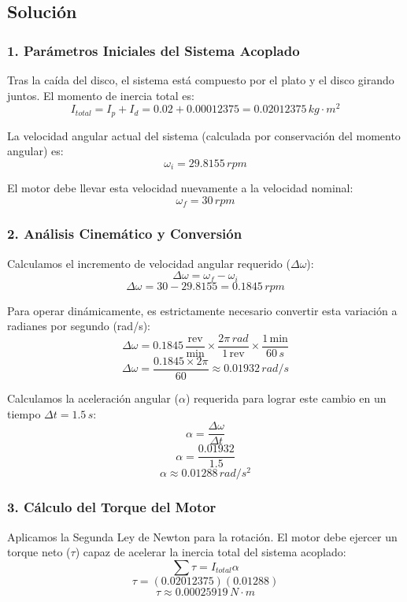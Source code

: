 \documentclass[12pt, a4paper]{article}
\begin{document}
\subsection*{Solución}

\subsubsection*{1. Parámetros Iniciales del Sistema Acoplado}
Tras la caída del disco, el sistema está compuesto por el plato y el disco girando juntos.
El momento de inercia total es:
$$I_{total} = I_p + I_d = 0.02 + 0.00012375 = 0.02012375 \, \si{kg\cdot m^2}$$

La velocidad angular actual del sistema (calculada por conservación del momento angular) es:
$$\omega_i = 29.8155 \, \si{rpm}$$

El motor debe llevar esta velocidad nuevamente a la velocidad nominal:
$$\omega_f = 30 \, \si{rpm}$$

\subsubsection*{2. Análisis Cinemático y Conversión}
Calculamos el incremento de velocidad angular requerido ($\Delta \omega$):
$$\Delta \omega = \omega_f - \omega_i$$
$$\Delta \omega = 30 - 29.8155 = 0.1845 \, \si{rpm}$$

Para operar dinámicamente, es estrictamente necesario convertir esta variación a radianes por segundo (\si{rad/s}):
$$\Delta \omega = 0.1845 \, \frac{\text{rev}}{\text{min}} \times \frac{2\pi \, \si{rad}}{1 \, \text{rev}} \times \frac{1 \, \text{min}}{60 \, \si{s}}$$
$$\Delta \omega = \frac{0.1845 \times 2\pi}{60} \approx 0.01932 \, \si{rad/s}$$

Calculamos la aceleración angular ($\alpha$) requerida para lograr este cambio en un tiempo $\Delta t = 1.5 \, \si{s}$:
$$\alpha = \frac{\Delta \omega}{\Delta t}$$
$$\alpha = \frac{0.01932}{1.5}$$
$$\alpha \approx 0.01288 \, \si{rad/s^2}$$

\subsubsection*{3. Cálculo del Torque del Motor}
Aplicamos la Segunda Ley de Newton para la rotación. El motor debe ejercer un torque neto ($\tau$) capaz de acelerar la inercia total del sistema acoplado:
$$\sum \tau = I_{total} \alpha$$
$$\tau = (0.02012375) (0.01288)$$
$$\tau \approx 0.00025919 \, \si{N\cdot m}$$
\end{document}
